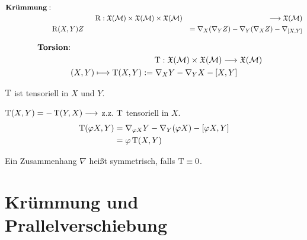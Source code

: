 \begin{align*}
\text{\textbf{Krümmung}}:\\
&\qquad \qquad \qquad\operatorname{R}: \mathfrak{X}(\mathcal{M}) \times \mathfrak{X}(\mathcal{M}) \times \mathfrak{X}(\mathcal{M}) &\longrightarrow \mathfrak{X}(\mathcal{M}) \\
&\operatorname{R}(X,Y)Z &= \nabla_X(\nabla_YZ) - \nabla_Y(\nabla_XZ) - \nabla_{[X,Y]}
\end{align*}


\begin{align*}
\text{\textbf{Torsion}:}\\
&\qquad\qquad\qquad\qquad\qquad \operatorname{T}: \mathfrak{X}(\mathcal{M}) \times \mathfrak{X}(\mathcal{M}) \longrightarrow \mathfrak{X}(\mathcal{M}) \\
&(X,Y) \longmapsto \operatorname{T}(X,Y) := \nabla_XY -\nabla_YX - [X,Y]
\end{align*}

\begin{lem}
$\operatorname{T}$ ist tensoriell in $X$ und $Y$.
\begin{bew}
$\operatorname{T}(X,Y) = -\operatorname{T}(Y,X)  \longrightarrow$ z.z. $\operatorname{T}$ tensoriell in $X$. 
\begin{align*}
\operatorname{T}(\varphi X,Y) &= \nabla_{\varphi X}Y -  \nabla_Y(\varphi X) - [\varphi X,Y] \\
						&= \varphi\operatorname{T}(X,Y)
\end{align*}
\end{bew}
\end{lem}

\begin{defs}
Ein Zusammenhang $\nabla$ heißt symmetrisch, falls $\operatorname{T} \equiv 0$.
\end{defs}


\section{Krümmung und Prallelverschiebung}

